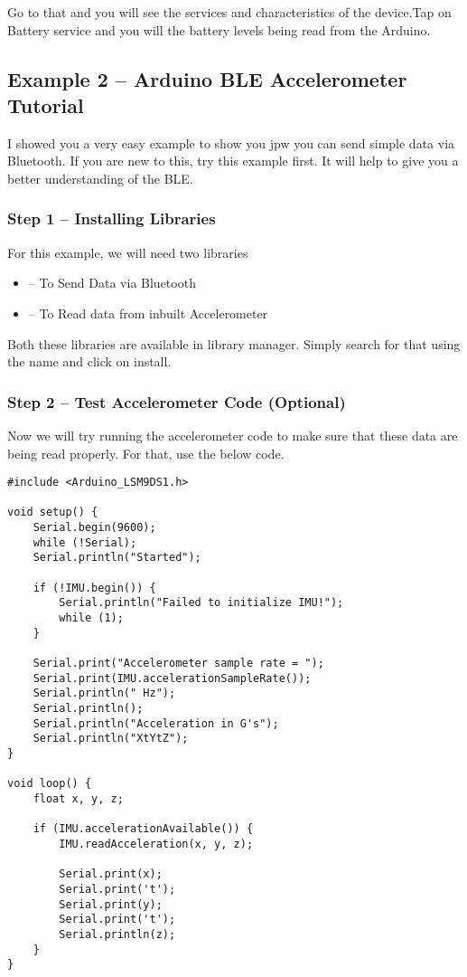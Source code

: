 Go to that and you will see the services and characteristics of the device.Tap on Battery service and you will the battery levels being read from the Arduino.



\subsection{Example 2 -- Arduino BLE Accelerometer Tutorial}

I showed you a very easy example to show you jpw you can send simple data via Bluetooth. If you are new to this, try this example first. It will help to give you a better understanding of the BLE.

\subsubsection{Step 1 -- Installing Libraries}

For this example, we will need two libraries 

\begin{itemize}
  \item {} -- To Send Data via Bluetooth
  \item {} -- To Read data from inbuilt Accelerometer
\end{itemize}

Both these libraries are available in library manager. Simply search for that using the name and click on install.

\subsubsection{Step 2 -- Test Accelerometer Code (Optional)}

Now we will try running the accelerometer code to make sure that these data are being read properly. For that, use the below code.


\begin{lstlisting}
#include <Arduino_LSM9DS1.h>

void setup() {
    Serial.begin(9600);
    while (!Serial);
    Serial.println("Started");
    
    if (!IMU.begin()) {
        Serial.println("Failed to initialize IMU!");
        while (1);
    }
    
    Serial.print("Accelerometer sample rate = ");
    Serial.print(IMU.accelerationSampleRate());
    Serial.println(" Hz");
    Serial.println();
    Serial.println("Acceleration in G's");
    Serial.println("XtYtZ");
}

void loop() {
    float x, y, z;
    
    if (IMU.accelerationAvailable()) {
        IMU.readAcceleration(x, y, z);
        
        Serial.print(x);
        Serial.print('t');
        Serial.print(y);
        Serial.print('t');
        Serial.println(z);
    }
}
\end{lstlisting}


